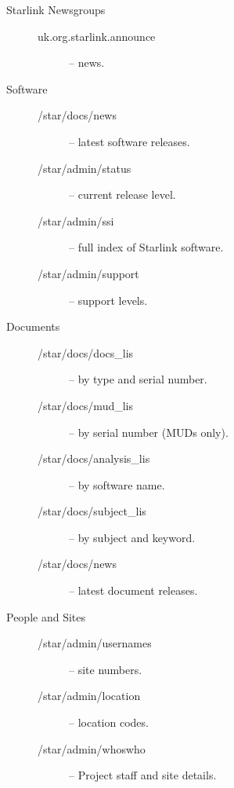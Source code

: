 \documentclass[twoside,11pt,nolof]{starlink}
\begin{document}
\begin{description}

\item [Starlink Newsgroups] \hspace*{\fill}

\begin{description}
\item [uk.org.starlink.announce] -- news.
\end{description}

\item [Software] \hspace*{\fill}

\begin{description}
\item [/star/docs/news] -- latest software releases.
\item [/star/admin/status] -- current release level.
\item [/star/admin/ssi] -- full index of Starlink software.
\item [/star/admin/support] -- support levels.
\end{description}

\item [Documents] \hspace*{\fill}

\begin{description}
\item [/star/docs/docs\_lis] --  by type and serial number.
\item [/star/docs/mud\_lis] -- by serial number (MUDs only).
\item [/star/docs/analysis\_lis] -- by software name.
\item [/star/docs/subject\_lis] --  by subject and keyword.
\item [/star/docs/news] -- latest document releases.
\end{description}

\item [People and Sites] \hspace*{\fill}

\begin{description}
\item [/star/admin/usernames] -- site numbers.
\item [/star/admin/location] -- location codes.
\item [/star/admin/whoswho] -- Project staff and site details.
\end{description}

\end{description}
\end{document}
